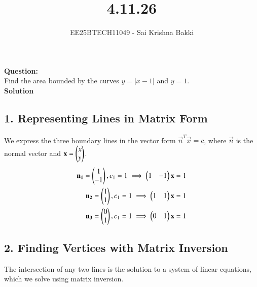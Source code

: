 \documentclass[journal]{IEEEtran}
\begin{document}

\vspace{3cm}

\title{4.11.26}
\author{EE25BTECH11049 - Sai Krishna Bakki}
 \maketitle
{\let\newpage\relax\maketitle}

\renewcommand{\thefigure}{\theenumi}
\renewcommand{\thetable}{\theenumi}
\setlength{\intextsep}{10pt} %


\renewcommand{\thetable}{\theenumi}
\textbf{Question:}\\
Find the area bounded by the curves $y = |x - 1|$ and $y = 1$.\\
\textbf{Solution}
\subsection*{1. Representing Lines in Matrix Form}
We express the three boundary lines in the vector form $\vec{n}^T \vec{x} = c$, where $\vec{n}$ is the normal vector and $\mathbf{x} = \begin{pmatrix}x \\ y\end{pmatrix}$.
\begin{align}
    \mathbf{n_1}=\begin{pmatrix}1\\-1\end{pmatrix},c_1=1\implies \begin{pmatrix}1 & -1\end{pmatrix}\mathbf{x}=1\\
    \mathbf{n_2}=\begin{pmatrix}1\\1\end{pmatrix},c_1=1\implies \begin{pmatrix}1 & 1\end{pmatrix}\mathbf{x}=1\\
    \mathbf{n_3}=\begin{pmatrix}0\\1\end{pmatrix},c_1=1\implies \begin{pmatrix}0 &1\end{pmatrix}\mathbf{x}=1
\end{align}

\subsection*{2. Finding Vertices with Matrix Inversion}
The intersection of any two lines is the solution to a system of linear equations, which we solve using matrix inversion.
\end{document}
